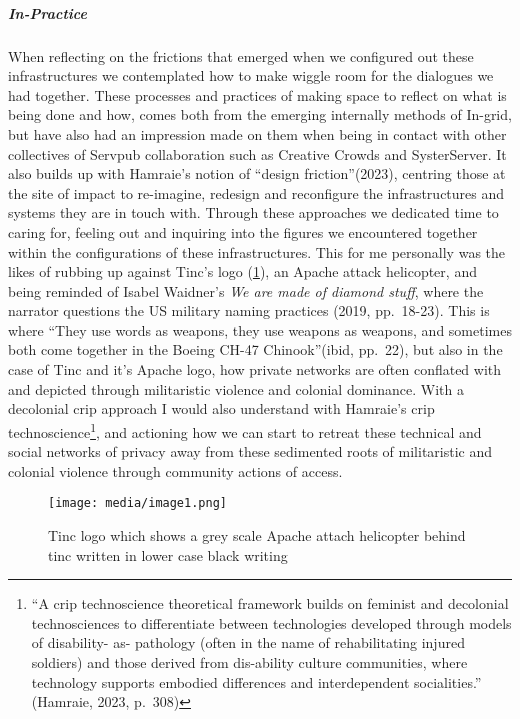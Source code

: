 \hypertarget{in-practice}{%
\subparagraph{In-Practice}\label{in-practice}}

When reflecting on the frictions that emerged when we configured out
these infrastructures we contemplated how to make wiggle room for the
dialogues we had together. These processes and practices of making space
to reflect on what is being done and how, comes both from the emerging
internally methods of In-grid, but have also had an impression made on
them when being in contact with other collectives of Servpub
collaboration such as Creative Crowds and SysterServer. It also builds
up with Hamraie's notion of ``design friction''(2023), centring those at
the site of impact to re-imagine, redesign and reconfigure the
infrastructures and systems they are in touch with. Through these
approaches we dedicated time to caring for, feeling out and inquiring
into the figures we encountered together within the configurations of
these infrastructures. This for me personally was the likes of rubbing
up against Tinc's logo (\cref{fig:tincLogo}), an Apache attack
helicopter, and being reminded of Isabel Waidner's \emph{We are made of
diamond stuff}, where the narrator questions the US military naming
practices (2019, pp.~18-23). This is where ``They use words as weapons,
they use weapons as weapons, and sometimes both come together in the
Boeing CH-47 Chinook''(ibid, pp.~22), but also in the case of Tinc and
it's Apache logo, how private networks are often conflated with and
depicted through militaristic violence and colonial dominance. With a
decolonial crip approach I would also understand with Hamraie's crip
technoscience\footnote{``A crip technoscience theoretical framework
  builds on feminist and decolonial technosciences to differentiate
  between technologies developed through models of disability- as-
  pathology (often in the name of rehabilitating injured soldiers) and
  those derived from dis-ability culture communities, where technology
  supports embodied differences and interdependent socialities.''
  (Hamraie, 2023, p.~308)}, and actioning how we can start to retreat
these technical and social networks of privacy away from these
sedimented roots of militaristic and colonial violence through community
actions of access.

\begin{figure}
\hypertarget{fig:tincLogo}{%
\centering
\texttt{[image: media/image1.png]}
\caption{Tinc logo which shows a grey scale Apache attach helicopter
behind tinc written in lower case black writing}\label{fig:tincLogo}
}
\end{figure}

